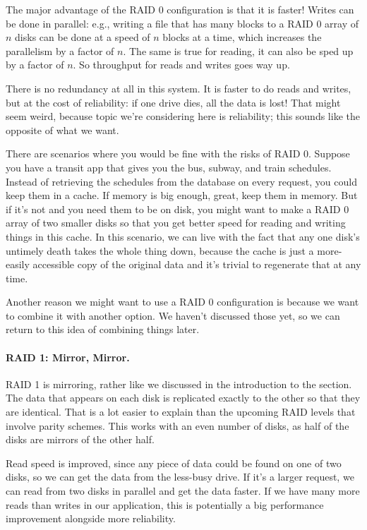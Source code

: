 The major advantage of the RAID 0 configuration is that it is faster! Writes can be done in parallel: e.g., writing a file that has many blocks to a RAID 0 array of $n$ disks can be done at a speed of $n$ blocks at a time, which increases the parallelism by a factor of $n$. The same is true for reading, it can also be sped up by a factor of $n$. So throughput for reads and writes goes way up.

There is no redundancy at all in this system. It is faster to do reads and writes, but at the cost of reliability: if one drive dies, all the data is lost! That might seem weird, because topic we're considering here is reliability; this sounds like the opposite of what we want.

There are scenarios where you would be fine with the risks of RAID 0. Suppose you have a transit app that gives you the bus, subway, and train schedules. Instead of retrieving the schedules from the database on every request, you could keep them in a cache. If memory is big enough, great, keep them in memory. But if it's not and you need them to be on disk, you might want to make a RAID 0 array of two smaller disks so that you get better speed for reading and writing things in this cache. In this scenario, we can live with the fact that any one disk's untimely death takes the whole thing down, because the cache is just a more-easily accessible copy of the original data and it's trivial to regenerate that at any time.

Another reason we might want to use a RAID 0 configuration is because we want to combine it with another option. We haven't discussed those yet, so we can return to this idea of combining things later.

\paragraph{RAID 1: Mirror, Mirror.}
RAID 1 is mirroring, rather like we discussed in the introduction to the section. The data that appears on each disk is replicated exactly to the other so that they are identical. That is a lot easier to explain than the upcoming RAID levels that involve parity schemes. This works with an even number of disks, as half of the disks are mirrors of the other half.

Read speed is improved, since any piece of data could be found on one of two disks, so we can get the data from the less-busy drive. If it's a larger request, we can read from two disks in parallel and get the data faster. If we have many more reads than writes in our application, this is potentially a big performance improvement alongside more reliability.

